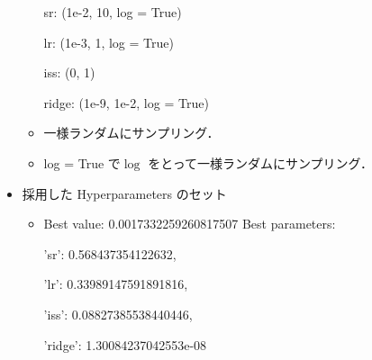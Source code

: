 \begin{frame}
\begin{columns}[T]
\begin{column}{.5\textwidth}
\begin{itemize}
\begin{itemize}
                    sr:  (1e-2, 10, log = True)

                    lr: (1e-3, 1, log = True)

                    iss: (0, 1)
                    
                    ridge: (1e-9, 1e-2, log = True)

                    \item 一様ランダムにサンプリング．
                    \item log = True で$\log$ をとって一様ランダムにサンプリング．
                \end{itemize}
                \item 採用した Hyperparameters のセット\begin{itemize}
                    \item Best value: 0.0017332259260817507
                    Best parameters: {
                        
                        'sr': 0.568437354122632, 
                        
                        'lr': 0.33989147591891816, 
                        
                        'iss': 0.08827385538440446, 
                        
                        'ridge': 1.30084237042553e-08}
                \end{itemize}
            \end{itemize}
        \end{column}
      \end{columns}
    
\end{frame}

